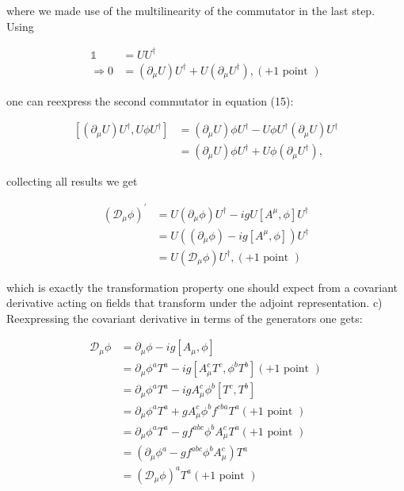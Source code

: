 \documentclass[10pt, letterpaper]{article}
\begin{document}
where we made use of the multilinearity of the commutator in the last step. Using

$$
\begin{aligned}
\mathbb{1} & =U U^{\dagger} \\
\Rightarrow 0 & =\left(\partial_\mu U\right) U^{\dagger}+U\left(\partial_\mu U^{\dagger}\right),(+1 \text { point })
\end{aligned}
$$

one can reexpress the second commutator in equation (15):

$$
\begin{aligned}
{\left[\left(\partial_\mu U\right) U^{\dagger}, U \phi U^{\dagger}\right] } & =\left(\partial_\mu U\right) \phi U^{\dagger}-U \phi U^{\dagger}\left(\partial_\mu U\right) U^{\dagger} \\
& =\left(\partial_\mu U\right) \phi U^{\dagger}+U \phi\left(\partial_\mu U^{\dagger}\right),
\end{aligned}
$$

collecting all results we get

$$
\begin{aligned}
\left(\mathcal{D}_\mu \phi\right)^{\prime} & =U\left(\partial_\mu \phi\right) U^{\dagger}-i g U\left[A^\mu, \phi\right] U^{\dagger} \\
& =U\left(\left(\partial_\mu \phi\right)-i g\left[A^\mu, \phi\right]\right) U^{\dagger} \\
& =U\left(\mathcal{D}_\mu \phi\right) U^{\dagger},(+1 \text { point })
\end{aligned}
$$

which is exactly the transformation property one should expect from a covariant derivative acting on fields that transform under the adjoint representation.
c) Reexpressing the covariant derivative in terms of the generators one gets:

$$
\begin{aligned}
\mathcal{D}_\mu \phi & =\partial_\mu \phi-i g\left[A_\mu, \phi\right] \\
& =\partial_\mu \phi^a T^a-i g\left[A_\mu^c T^c, \phi^b T^b\right](+1 \text { point }) \\
& =\partial_\mu \phi^a T^a-i g A_\mu^c \phi^b\left[T^c, T^b\right] \\
& =\partial_\mu \phi^a T^a+g A_\mu^c \phi^b f^{c b a} T^a(+1 \text { point }) \\
& =\partial_\mu \phi^a T^a-g f^{a b c} \phi^b A_\mu^c T^a(+1 \text { point }) \\
& =\left(\partial_\mu \phi^a-g f^{a b c} \phi^b A_\mu^c\right) T^a \\
& =\left(\mathcal{D}_\mu \phi\right)^a T^a(+1 \text { point })
\end{aligned}
$$
\end{document}
